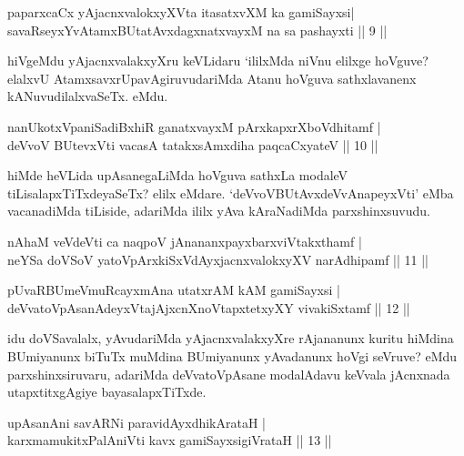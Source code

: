 \begin{shl}
paparxcaCx yAjacnxvalokxyXV\s ta itasatxvXM ka gamiSayxsi|\\
savaRseyxYvA\s \s tamxBUtatAvxdagxnatxvayxM na sa pashayxti \hfill || 9 || 
\end{shl}

\begin{artha}
hiVgeMdu yAjacnxvalakxyXru keVLidaru `ililxMda niVnu elilxge hoVguve? elalxvU AtamxsavxrUpavAgiruvudariMda Atanu hoVguva sathxlavanenx kANuvudilalxvaSeTx. eMdu.
\end{artha}


\begin{shl}
nanUkotxVpaniSadiBxhiR ganatxvayxM pArxkapxrXboVdhitamf |\\
deVvoV BUtevxVti vacasA tatakxsAmxdiha paqcaCxyateV \hfill || 10 || 
\end{shl}

\begin{artha}
hiMde heVLida upAsanegaLiMda hoVguva sathxLa modaleV tiLisalapxTiTxdeyaSeTx? elilx eMdare. `deVvoVBUtAvxdeVvAnapeyxVti' eMba vacanadiMda tiLiside, adariMda ililx yAva kAraNadiMda parxshinxsuvudu.
\end{artha}


\begin{shl}
nAhaM veVdeVti ca naqpoV jAnananxpayxbarxviVtakxthamf |\\
neYSa doVSoV yatoV\s pArxkiSxVdAyxjacnxvalokxyXV narAdhipamf \hfill || 11 || 
\end{shl}

\begin{shl}
pUvaRBUmeVmuRcayxmAna utatxrAM kAM gamiSayxsi |\\
deVvatoVpAsanAdeyxVtajAjxcnXnoVtapxtetxyXY vivakiSxtamf \hfill || 12 || 
\end{shl}

\begin{artha}
idu doVSavalalx, yAvudariMda yAjacnxvalakxyXre rAjananunx kuritu hiMdina BUmiyanunx biTuTx muMdina BUmiyanunx yAvadanunx hoVgi seVruve? eMdu parxshinxsiruvaru, adariMda deVvatoVpAsane modalAdavu keVvala jAcnxnada utapxtitxgAgiye bayasalapxTiTxde.
\end{artha}

\begin{shl}
upAsanAni savARNi paravidAyxdhikArataH |\\
karxmamukitxPalAniVti kavx gamiSayxsigiVrataH \hfill || 13 || 
\end{shl}

